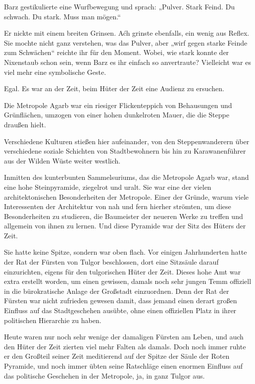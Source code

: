 Barz gestikulierte eine Wurfbewegung und sprach: „Pulver. Stark Feind. Du schwach. Du stark. Muss man mögen.“

Er nickte mit einem breiten Grinsen. Aćh grinste ebenfalls, ein wenig aus Reflex. Sie mochte nicht ganz verstehen, was das Pulver, aber „wirf gegen starke Feinde zum Schwächen“ reichte ihr für den Moment. Wobei, wie stark konnte der Nixenstaub schon sein, wenn Barz es ihr einfach so anvertraute? Vielleicht war es viel mehr eine symbolische Geste.

Egal. Es war an der Zeit, beim Hüter der Zeit eine Audienz zu ersuchen.



\trennzeichen



Die Metropole Agarb war ein riesiger Flickenteppich von Behausungen und Grünflächen, umzogen von einer hohen dunkelroten Mauer, die die Steppe draußen hielt.

Verschiedene Kulturen stießen hier aufeinander, von den Steppenwanderern über verschiedene soziale Schichten von Stadtbewohnern bis hin zu Karawanenführer aus der Wilden Wüste weiter westlich.

Inmitten des kunterbunten Sammelsuriums, das die Metropole Agarb war, stand eine hohe Steinpyramide, ziegelrot und uralt. Sie war eine der vielen architektonischen Besonderheiten der Metropole. Einer der Gründe, warum viele Interessenten der Architektur von nah und fern hierher strömten, um diese Besonderheiten zu studieren, die Baumeister der neueren Werke zu treffen und allgemein von ihnen zu lernen. Und diese Pyramide war der Sitz des Hüters der Zeit.

Sie hatte keine Spitze, sondern war oben flach. Vor einigen Jahrhunderten hatte der Rat der Fürsten von Tulgor beschlossen, dort eine Sitzsäule darauf einzurichten, eigens für den tulgorischen Hüter der Zeit. Dieses hohe Amt war extra erstellt worden, um einen gewissen, damals noch sehr jungen Temm offiziell in die bürokratische Anlage der Großstadt einzuordnen. Denn der Rat der Fürsten war nicht zufrieden gewesen damit, dass jemand einen derart großen Einfluss auf das Stadtgeschehen ausübte, ohne einen offiziellen Platz in ihrer politischen Hierarchie zu haben.

Heute waren nur noch sehr wenige der damaligen Fürsten am Leben, und auch den Hüter der Zeit zierten viel mehr Falten als damals. Doch noch immer ruhte er den Großteil seiner Zeit meditierend auf der Spitze der Säule der Roten Pyramide, und noch immer übten seine Ratschläge einen enormen Einfluss auf das politische Geschehen in der Metropole, ja, in ganz Tulgor aus.

